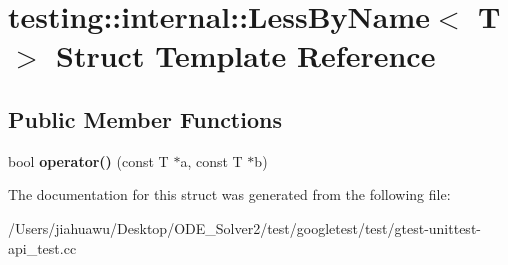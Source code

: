 \hypertarget{structtesting_1_1internal_1_1_less_by_name}{}\section{testing\+:\+:internal\+:\+:Less\+By\+Name$<$ T $>$ Struct Template Reference}
\label{structtesting_1_1internal_1_1_less_by_name}
\subsection*{Public Member Functions}
\begin{DoxyCompactItemize}
\item 
\mbox{\label{structtesting_1_1internal_1_1_less_by_name_a62386ac7750bfc035536be55d90a52eb}} 
bool {\bfseries operator()} (const T $\ast$a, const T $\ast$b)
\end{DoxyCompactItemize}


The documentation for this struct was generated from the following file\+:\begin{DoxyCompactItemize}
\item 
/\+Users/jiahuawu/\+Desktop/\+O\+D\+E\+\_\+\+Solver2/test/googletest/test/gtest-\/unittest-\/api\+\_\+test.\+cc\end{DoxyCompactItemize}
